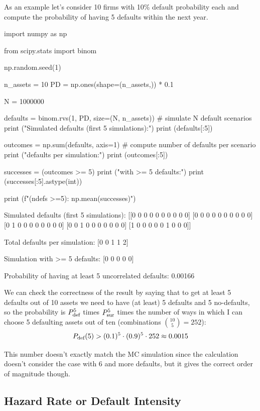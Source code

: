 As an example let's consider 10 firms with 10\% default probability each and compute the probability of having 5 defaults within the next year.
\begin{ipythonnon}
import numpy as np

from scipy.stats import binom

np.random.seed(1)

n_assets = 10
PD = np.ones(shape=(n_assets,)) * 0.1

N = 1000000

defaults = binom.rvs(1, PD, size=(N, n_assets)) # simulate N default scenarios
print ("Simulated defaults (first 5 simulations):")
print (defaults[:5])

outcomes = np.sum(defaults, axis=1) # compute number of defaults per scenario
print ("\nTotal defaults per simulation:")
print (outcomes[:5])

successes = (outcomes >= 5)
print ("\nSimulation with >= 5 defaults:")
print (successes[:5].astype(int))

print (f"\nP(ndefs >=5): {np.mean(successes)}")
\end{ipythonnon}
\begin{ioutput}
Simulated defaults (first 5 simulations):
[[0 0 0 0 0 0 0 0 0 0]
[0 0 0 0 0 0 0 0 0 0]
[0 1 0 0 0 0 0 0 0 0]
[0 0 1 0 0 0 0 0 0 0]
[1 0 0 0 0 0 1 0 0 0]]

Total defaults per simulation:
[0 0 1 1 2]

Simulation with >= 5 defaults:
[0 0 0 0 0]

Probability of having at least 5 uncorrelated defaults: 0.00166
\end{ioutput}

We can check the correctness of the result by saying that to get at least 5 defaults out of 10 assets we need to have (at least) 5 defaults and 5 no-defaults, so the probability is $P_{\text{def}}^5$ times $P_{\text{sur}}^5$ times the number
of ways in which I can choose 5 defaulting assets out of ten (combinations $\binom{10}{5}=252$):
\begin{equation*}
P_{\text{def}}(5) > (0.1)^5 \cdot (0.9)^5 \cdot 252 \approx 0.0015
\end{equation*}

This number doesn't exactly match the MC simulation since the calculation doesn't consider the case with 6 and more defaults, but it gives the correct order of magnitude though.

\subsection{Hazard Rate or Default Intensity}
\label{hazard-rate}

